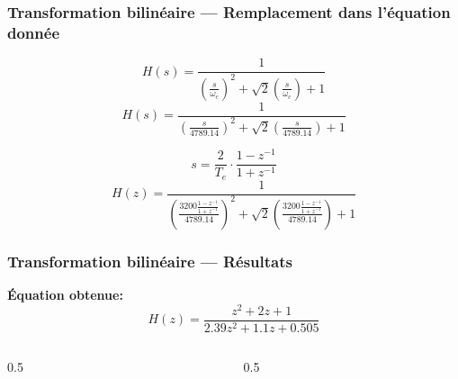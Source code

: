 \begin{frame}
	\frametitle{Transformation bilinéaire — Remplacement dans l'équation donnée}
	\begin{equation}
		H(s)=\frac{1}{(\frac{s}{\omega_c})^2+\sqrt2(\frac{s}{\omega_c})+1}
	\end{equation}
	\begin{equation}
		H(s)=\frac{1}{(\frac{s}{4789.14})^2+\sqrt2(\frac{s}{4789.14})+1}
	\end{equation}

	\vspace{0.5cm}

	\begin{equation}
		s=\frac{2}{T_e}\cdot\frac{1-z^{-1}}{1+z^{-1}}
	\end{equation}
	\begin{equation}
		H(z)=\frac{1}{
		(\frac{
		3200\frac{1-z^{-1}}{1+z^{-1}}}
		{4789.14})^2
		+\sqrt2
		(\frac{
		3200\frac{1-z^{-1}}{1+z^{-1}}
		}{4789.14})
		+1}
	\end{equation}
\end{frame}

\begin{frame}
\frametitle{Transformation bilinéaire — Résultats}
\textbf{Équation obtenue:}
	\begin{equation}
		H(z) = \frac{ z^2 + 2z + 1 }{ 2.39z^2 + 1.1z + 0.505 }
	\end{equation}

	\begin{columns}

		\begin{column}{0.5\textwidth}
		\end{column}

		\begin{column}{0.5\textwidth}
		\end{column}

	\end{columns}
\end{frame}

